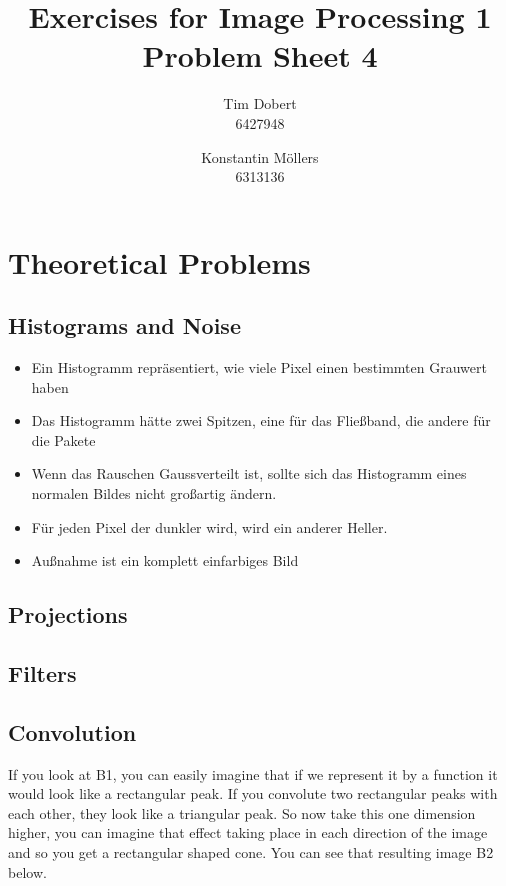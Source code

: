 \documentclass[a4paper,12pt]{article}
\title{\textbf{Exercises for Image Processing 1}\\Problem Sheet 4}
\author{Tim Dobert\\6427948 \and Konstantin M\"ollers\\6313136}
\begin{document}
	\maketitle	
	
	\section{Theoretical Problems}
	\subsection{Histograms and Noise}
	
	\begin{itemize}
		\item Ein Histogramm repräsentiert, wie viele Pixel einen bestimmten Grauwert haben
		\item Das Histogramm hätte zwei Spitzen, eine für das Fließband, die andere für die Pakete
		\item Wenn das Rauschen Gaussverteilt ist, sollte sich das Histogramm eines normalen Bildes nicht großartig ändern.
		\item Für jeden Pixel der dunkler wird, wird ein anderer Heller.
		\item Außnahme ist ein komplett einfarbiges Bild
	\end{itemize}
	
	\subsection{Projections}
	\subsection{Filters}
	\subsection{Convolution}
	
	If you look at B1, you can easily imagine that if we represent it by a function it would look like a rectangular peak. If you convolute two rectangular peaks with each other, they look like a triangular peak. So now take this one dimension higher, you can imagine that effect taking place in each direction of the image and so you get a rectangular shaped cone. You can see that resulting image B2 below.
	
\end{document}
